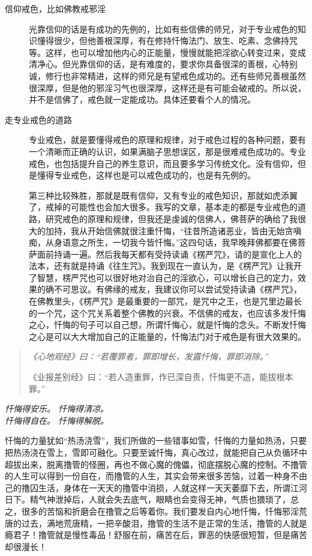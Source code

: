 \begin{description}
    \item[信仰戒色，比如佛教戒邪淫] 光靠信仰的话是有成功的先例的，比如有些信佛的师兄，对于专业戒色的知识懂得很少，但他善根深厚，有在修持忏悔法门、放生、吃素、念佛持咒等。这样，也可以增加他内心的正能量，慢慢就能把淫欲心转变过来，变成清净心。但光靠信仰的话，是有难度的，要求你具备很深的善根，心特别诚，修行也非常精进，这样的师兄是有望戒色成功的。还有些师兄善根虽然很深厚，但是他的邪淫习气也很深厚，这样还是有可能会破戒的。所以说，并不是信佛了，戒色就一定能成功。具体还要看个人的情况。
    \item[走专业戒色的道路] 专业戒色，就是要懂得戒色的原理和规律，对于戒色过程的各种问题，要有一个清晰而正确的认识，如果满脑子思想误区，那是很难戒色成功的。专业戒色，也包括提升自己的养生意识，而且要多学习传统文化。没有信仰，但是懂得专业戒色，这样也是可以戒色成功的，也是有先例的。
    \item[] 第三种比较殊胜，那就是既有信仰，又有专业的戒色知识，那就如虎添翼了，戒掉的可能性也会加大很多。我写的文章，基本走的都是专业戒色的道路，研究戒色的原理和规律，但我还是虔诚的信佛人，佛菩萨的确给了我很大的加持，我从开始信佛就很注重忏悔，“往昔所造诸恶业，皆由无始贪嗔痴，从身语意之所生，一切我今皆忏悔。”这四句话，我早晚拜佛都要在佛菩萨面前持诵一遍。然后我每天都有受持读诵《楞严咒》，请的是宣化上人的法本，还有就是持诵《往生咒》。我到现在一直认为，是《楞严咒》让我开了智慧，楞严咒也可以很好地对治自己的淫欲心，可以增长自己的定力，效果的确不可思议。有佛缘的戒友，我建议你可以尝试受持读诵《楞严咒》，在佛教里头，《楞严咒》是最重要的一部咒，是咒中之王，也是咒里边最长的一个咒，这个咒关系着整个佛教的兴衰。不信佛的戒友，也应该多发忏悔之心，忏悔的句子可以自己想，所谓忏悔心，就是忏悔的念头。不断发忏悔之心是可以大大增加自己的正能量的，忏悔法门对于戒色是有很大效果的。
\end{description}

\begin{quotation}\it
    《心地观经》曰：“若覆罪者，罪即增长，发露忏悔，罪即消除。”

    《业报差别经》曰：“若人造重罪，作已深自责，忏悔更不造，能拔根本罪。”
\end{quotation}

\begin{center}\it
    忏悔得安乐。    忏悔得清凉。\\
    忏悔得自在。    忏悔得解脱。
\end{center}

忏悔的力量犹如“热汤浇雪”，我们所做的一些错事如雪，忏悔的力量如热汤，只要把热汤浇在雪上，雪即可融化。只要至诚忏悔，真心改过，就能把自己从负循环中超拔出来，脱离撸管的怪圈，再也不做心魔的傀儡，彻底摆脱心魔的控制。不撸管的人生可以得到一份自在，而撸管的人生，其实会带来很多苦恼，过着一种身不由己的撸囚生活，身体在一天天的撸管中消损，人就这样一天天萎靡下去，所谓江河日下。精气神泄掉后，人就会失去底气，眼睛也会变得无神，气质也猥琐了，总之，很多的苦恼和折磨会在撸管之后等着你。我们要发自内心地忏悔，忏悔邪淫荒唐的过去，满地荒唐精，一把辛酸泪，撸管的生活不是正常的生活，撸管的人就是瘾君子！撸管就是慢性毒品！舒服在前，痛苦在后，罪恶的快感很短暂，但是痛苦却很漫长！

